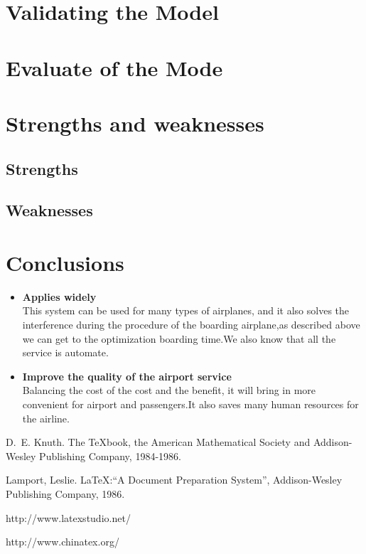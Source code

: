 \documentclass{mcmthesis}
\begin{document}
\section{Validating the Model}




\section{Evaluate of the Mode}

\section{Strengths and weaknesses}


\subsection{Strengths}
\subsection{Weaknesses}

\section{Conclusions}
\begin{itemize}
\item \textbf{Applies widely}\\
This  system can be used for many types of airplanes, and it also
solves the interference during  the procedure of the boarding
airplane,as described above we can get to the  optimization
boarding time.We also know that all the service is automate.
\item \textbf{Improve the quality of the airport service}\\
Balancing the cost of the cost and the benefit, it will bring in
more convenient  for airport and passengers.It also saves many
human resources for the airline.
\end{itemize}














\begin{thebibliography}{99}
 D.~E. Knuth.  The \TeX{}book,
the American Mathematical Society and Addison-Wesley Publishing Company, 1984-1986.

Lamport, Leslie.  \LaTeX{}:``A Document Preparation System'',
Addison-Wesley Publishing Company, 1986.

http://www.latexstudio.net/


http://www.chinatex.org/

\end{thebibliography}
\end{document}
